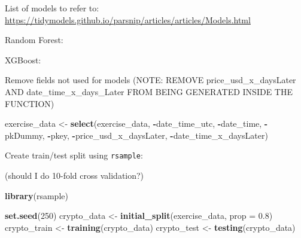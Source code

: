 \documentclass[
]{book}
\newenvironment{Shaded}{\begin{snugshade}}{\end{snugshade}}
\newcommand{\DataTypeTok}[1]{\textcolor[rgb]{0.13,0.29,0.53}{#1}}
\newcommand{\DecValTok}[1]{\textcolor[rgb]{0.00,0.00,0.81}{#1}}
\newcommand{\FloatTok}[1]{\textcolor[rgb]{0.00,0.00,0.81}{#1}}
\newcommand{\KeywordTok}[1]{\textcolor[rgb]{0.13,0.29,0.53}{\textbf{#1}}}
\newcommand{\NormalTok}[1]{#1}
\newcommand{\OperatorTok}[1]{\textcolor[rgb]{0.81,0.36,0.00}{\textbf{#1}}}
\newcommand{\StringTok}[1]{\textcolor[rgb]{0.31,0.60,0.02}{#1}}
\begin{document}
List of models to refer to: \url{https://tidymodels.github.io/parsnip/articles/articles/Models.html}

Random Forest:

\begin{Shaded}
\end{Shaded}

XGBoost:

\begin{Shaded}
\end{Shaded}

Remove fields not used for models (NOTE: REMOVE price\_usd\_x\_daysLater AND date\_time\_x\_days\_Later FROM BEING GENERATED INSIDE THE FUNCTION)

\begin{Shaded}
\begin{Highlighting}[]
\NormalTok{exercise_data <-}\StringTok{ }\KeywordTok{select}\NormalTok{(exercise_data, }\OperatorTok{-}\NormalTok{date_time_utc, }\OperatorTok{-}\NormalTok{date_time, }\OperatorTok{-}\NormalTok{pkDummy, }\OperatorTok{-}\NormalTok{pkey, }\OperatorTok{-}\NormalTok{price_usd_x_daysLater, }\OperatorTok{-}\NormalTok{date_time_x_daysLater)}
\end{Highlighting}
\end{Shaded}

Create train/test split using \texttt{rsample}\citep{R-rsample}:

(should I do 10-fold cross validation?)

\begin{Shaded}
\begin{Highlighting}[]
\KeywordTok{library}\NormalTok{(rsample)}

\KeywordTok{set.seed}\NormalTok{(}\DecValTok{250}\NormalTok{)}
\NormalTok{crypto_data <-}\StringTok{ }\KeywordTok{initial_split}\NormalTok{(exercise_data, }\DataTypeTok{prop =} \FloatTok{0.8}\NormalTok{)}
\NormalTok{crypto_train <-}\StringTok{ }\KeywordTok{training}\NormalTok{(crypto_data)}
\NormalTok{crypto_test  <-}\StringTok{  }\KeywordTok{testing}\NormalTok{(crypto_data)}
\end{Highlighting}
\end{Shaded}
\end{document}
